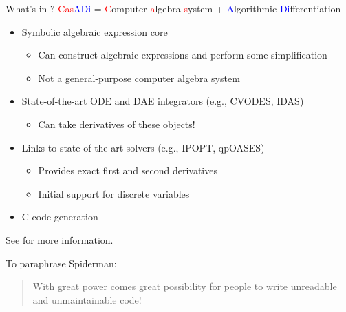 \documentclass[xcolor=dvipsnames,handout]{beamer}
\begin{document}
\begin{frame}{What's in \casadi?}
    \textcolor{red}{Cas}\textcolor{blue}{ADi} = \textcolor{red}{C}omputer \textcolor{red}{a}lgebra \textcolor{red}{s}ystem + \textcolor{blue}{A}lgorithmic \textcolor{blue}{Di}fferentiation
    \begin{itemize}
        \item<+-> Symbolic algebraic expression core
        \begin{itemize}
            \item Can construct algebraic expressions and perform some simplification
            \item Not a general-purpose computer algebra system
        \end{itemize}
        \item<+-> State-of-the-art ODE and DAE integrators (e.g., CVODES, IDAS)
        \begin{itemize}
            \item Can take derivatives of these objects!
        \end{itemize}
        \item<+-> Links to state-of-the-art solvers (e.g., IPOPT, qpOASES)
        \begin{itemize}
            \item Provides exact first and second derivatives
            \item Initial support for discrete variables
        \end{itemize}
        \item<+-> C code generation
    \end{itemize} \pause
    
    See  for more information. \pause
    
    \bigskip
    
    To paraphrase Spiderman: \pause
    \begin{quote}
        With great power comes great possibility for people to write unreadable and unmaintainable code!
    \end{quote}
\end{frame}
\end{document}
